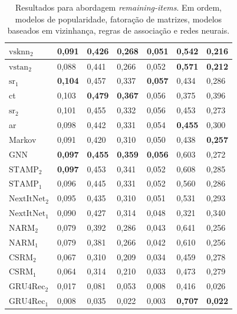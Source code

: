 \begin{table}[htbp]
\begin{tabular}{|l|l|l|l|l|l|l|}
    \hline
    $\text{vsknn}_2$ & 0,091 & 0,426 & 0,268 & 0,051 & 0,542 & 0,216 \\
    \hline
    $\text{vstan}_2$ & 0,088 & 0,441 & 0,266 & 0,052 & \textbf{0,571} & \textbf{0,212} \\
    \hline
   \hline
   $\text{sr}_1$ & \textbf{0,104} & 0,457 & 0,337 & \textbf{0,057} & 0,434 & 0,286 \\
   \hline
   ct & 0,103 & \textbf{0,479} & \textbf{0,367} & 0,056 & 0,375 & 0,396 \\
   \hline
   $\text{sr}_2$ & 0,101 & 0,455 & 0,332 & 0,056 & 0,453 & 0,273 \\
   \hline
    ar & 0,098 & 0,442 & 0,331 & 0,054 & \textbf{0,455} & 0,300 \\
   \hline
    Markov & 0,091 & 0,420 & 0,310 & 0,050 & 0,438 & \textbf{0,257} \\
   \hline
   \hline
   GNN & \textbf{0,097} & \textbf{0,455} & \textbf{0,359} & \textbf{0,056} & 0,603 & 0,272 \\
   \hline
   $\text{STAMP}_2$ & \textbf{0,097} & 0,453 & 0,341 & 0,052 & 0,608 & 0,285 \\
   \hline
   $\text{STAMP}_1$ & 0,096 & 0,445 & 0,331 & 0,052 & 0,560 & 0,286 \\
   \hline
   $\text{NextItNet}_2$ & 0,095 & 0,435 & 0,310 & 0,051 & 0,531 & 0,293 \\
   \hline
   $\text{NextItNet}_1$ & 0,090 & 0,427 & 0,314 & 0,048 & 0,321 & 0,340 \\
   \hline
   $\text{NARM}_2$ & 0,079 & 0,392 & 0,286 & 0,043 & 0,641 & 0,256 \\
   \hline
   $\text{NARM}_1$ & 0,079 & 0,381 & 0,266 & 0,042 & 0,610 & 0,256 \\
   \hline
   $\text{CSRM}_2$ & 0,067 & 0,310 & 0,209 & 0,034 & 0,459 & 0,278 \\
   \hline
   $\text{CSRM}_1$ & 0,064 & 0,314 & 0,210 & 0,033 & 0,473 & 0,279 \\
   \hline
   $\text{GRU4Rec}_2$ & 0,017 & 0,081 & 0,053 & 0,008 & 0,416 & 0,026 \\
   \hline
   $\text{GRU4Rec}_1$ & 0,008 & 0,035 & 0,022 & 0,003 & \textbf{0,707} & \textbf{0,022} \\
   \hline
  \end{tabular}
  \caption{Resultados para abordagem \textit{remaining-items}. Em ordem, modelos
  de popularidade, fatoração de matrizes, modelos baseados em vizinhança, regras
  de associação e redes neurais.}
  \label{tab:model_metrics}
\end{table}

